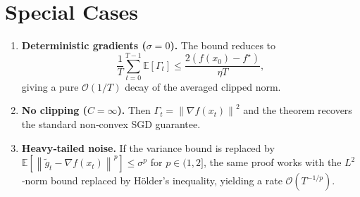 \documentclass{article}
\newcommand{\EE}{\mathbb{E}}
\newcommand{\norm}[1]{\left\lVert #1\right\rVert}
\begin{document}
\section*{Special Cases}
\begin{enumerate}[label=\arabic*.]
\item \textbf{Deterministic gradients ($\sigma=0$).} The bound reduces to
\[
\frac{1}{T}\sum_{t=0}^{T-1}\EE[\Gamma_t]\le\frac{2(f(x_0)-f^\star)}{\eta T},
\]
giving a pure $\mathcal{O}(1/T)$ decay of the averaged clipped norm.
\item \textbf{No clipping ($C=\infty$).} Then $\Gamma_t=\norm{\nabla f(x_t)}^2$ and the theorem recovers the standard non‑convex SGD guarantee.
\item \textbf{Heavy‑tailed noise.} If the variance bound is replaced by $\EE[\norm{\tilde g_t-\nabla f(x_t)}^p]\le\sigma^p$ for $p\in(1,2]$, the same proof works with the $L^2$‑norm bound replaced by Hölder’s inequality, yielding a rate $\mathcal{O}(T^{-1/p})$.
\end{enumerate}
\end{document}
